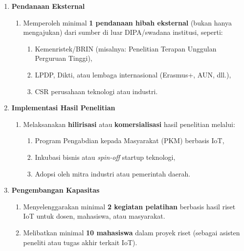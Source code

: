 \documentclass[12pt,a4paper]{article}
\begin{document}
\begin{enumerate}[leftmargin=*]
    \item \textbf{Pendanaan Eksternal}
          \begin{enumerate}
              \item Memperoleh minimal \textbf{1 pendanaan hibah eksternal} (bukan hanya mengajukan) dari sumber di luar DIPA/swadana institusi, seperti:
                    \begin{enumerate}
                        \item Kemenristek/BRIN (misalnya: Penelitian Terapan Unggulan Perguruan Tinggi),
                        \item LPDP, Dikti, atau lembaga internasional (Erasmus+, AUN, dll.),
                        \item CSR perusahaan teknologi atau industri.
                    \end{enumerate}
          \end{enumerate}

    \item \textbf{Implementasi Hasil Penelitian}
          \begin{enumerate}
              \item Melaksanakan \textbf{hilirisasi} atau \textbf{komersialisasi} hasil penelitian melalui:
                    \begin{enumerate}
                        \item Program Pengabdian kepada Masyarakat (PKM) berbasis IoT,
                        \item Inkubasi bisnis atau \textit{spin-off} startup teknologi,
                        \item Adopsi oleh mitra industri atau pemerintah daerah.
                    \end{enumerate}
          \end{enumerate}

    \item \textbf{Pengembangan Kapasitas}
          \begin{enumerate}
              \item Menyelenggarakan minimal \textbf{2 kegiatan pelatihan} berbasis hasil riset IoT untuk dosen, mahasiswa, atau masyarakat.
              \item Melibatkan minimal \textbf{10 mahasiswa} dalam proyek riset (sebagai asisten peneliti atau tugas akhir terkait IoT).
          \end{enumerate}
\end{enumerate}
\end{document}
